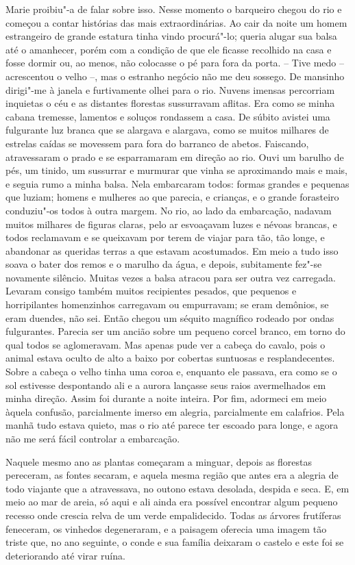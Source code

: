 Marie proibiu"-a de falar sobre isso. Nesse momento o barqueiro chegou do
rio e começou a contar histórias das mais extraordinárias. Ao cair da
noite um homem estrangeiro de grande estatura tinha vindo procurá"-lo;
queria alugar sua balsa até o amanhecer, porém com a condição de que
ele ficasse recolhido na casa e fosse dormir ou, ao menos, não
colocasse o pé para fora da porta.
\pagebreak
-- Tive medo -- acrescentou o velho --, mas o estranho negócio não me
deu sossego. De mansinho dirigi"-me à janela e furtivamente olhei para o
rio. Nuvens imensas percorriam inquietas o céu e as distantes florestas
sussurravam aflitas. Era como se minha cabana tremesse, lamentos e
soluços rondassem a casa. De súbito avistei uma fulgurante luz branca
que se alargava e alargava, como se muitos milhares de estrelas caídas
se movessem para fora do barranco de abetos. Faiscando, atravessaram o
prado e se esparramaram em direção ao rio. Ouvi um barulho de pés, um
tinido, um sussurrar e murmurar que vinha se aproximando mais e mais, e
seguia rumo a minha balsa. Nela embarcaram todos: formas grandes e
pequenas que luziam; homens e mulheres ao que parecia, e crianças, e o
grande forasteiro conduziu"-os todos à outra margem. No rio, ao lado da
embarcação, nadavam muitos milhares de figuras claras, pelo ar
esvoaçavam luzes e névoas brancas, e todos reclamavam e se queixavam
por terem de viajar para tão, tão longe, e abandonar as queridas terras
a que estavam acostumados. Em meio a tudo isso soava o bater dos remos
e o marulho da água, e depois, subitamente fez"-se novamente silêncio.
Muitas vezes a balsa atracou para ser outra vez carregada. Levaram
consigo também muitos recipientes pesados, que pequenos e horripilantes
homenzinhos carregavam ou empurravam; se eram demônios, se eram
duendes, não sei. Então chegou um séquito magnífico rodeado por ondas
fulgurantes. Parecia ser um ancião sobre um pequeno corcel branco, em
torno do qual todos se aglomeravam. Mas apenas pude ver a cabeça do
cavalo, pois o animal estava oculto de alto a baixo por cobertas
suntuosas e resplandecentes. Sobre a cabeça o velho tinha uma coroa e,
enquanto ele passava, era como se o sol estivesse despontando ali e a
aurora lançasse seus raios avermelhados em minha direção. Assim foi
durante a noite inteira. Por fim, adormeci em meio àquela confusão,
parcialmente imerso em alegria, parcialmente em calafrios. Pela manhã
tudo estava quieto, mas o rio até parece ter escoado para longe, e
agora não me será fácil controlar a embarcação.

Naquele mesmo ano as plantas começaram a minguar, depois as florestas
pereceram, as fontes secaram, e aquela mesma região que antes era a
alegria de todo viajante que a atravessava, no outono estava desolada,
despida e seca. E, em meio ao mar de areia, só aqui e ali ainda era
possível encontrar algum pequeno recesso onde crescia relva de um verde
empalidecido. Todas as árvores frutíferas feneceram, os \mbox{vinhedos}
\mbox{degeneraram}, e a paisagem oferecia uma imagem tão triste que, no ano
seguinte, o conde e sua família deixaram o castelo e este foi se
deteriorando até virar ruína.

